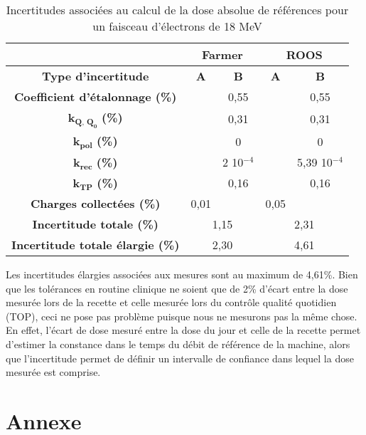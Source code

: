 \documentclass{article}
\begin{document}
\begin{table}[h]
  \centering
  \begin{tabular}{c|cc|cc|}
  \cline{2-5}
  \textbf{} & \multicolumn{2}{c|}{\textbf{Farmer}} & \multicolumn{2}{c|}{\textbf{ROOS}} \\ \hline
  \multicolumn{1}{|c|}{\textbf{Type d'incertitude}} & \textbf{A} & \textbf{B} & \textbf{A} & \textbf{B} \\ \hline
  \multicolumn{1}{|c|}{\textbf{Coefficient d'étalonnage (\%)}} &  & 0,55 &  & 0,55 \\
  \multicolumn{1}{|c|}{$\mathbf{k_{Q,\, Q_0}}$ \textbf{(\%)}} &  & 0,31 &  & 0,31 \\
  \multicolumn{1}{|c|}{$\mathbf{k_{pol}}$ \textbf{(\%)}} &  & 0 &  & 0 \\
  \multicolumn{1}{|c|}{$\mathbf{k_{rec}}$ \textbf{(\%)}} &  & 2 10$^{-4}$ &  & 5,39 10$^{-4}$ \\
  \multicolumn{1}{|c|}{$\mathbf{k_{TP}}$ \textbf{(\%)}} &  & 0,16 &  & 0,16 \\
  \multicolumn{1}{|c|}{\textbf{Charges collectées (\%)}} & 0,01 &  & 0,05 & \textbf{} \\ \hline
  \multicolumn{1}{|c|}{\textbf{Incertitude totale (\%)}} & \multicolumn{2}{c|}{1,15} & \multicolumn{2}{c|}{2,31} \\
  \multicolumn{1}{|c|}{\textbf{Incertitude totale élargie (\%)}} & \multicolumn{2}{c|}{2,30} & \multicolumn{2}{c|}{4,61} \\ \hline
  \end{tabular}
  \caption{Incertitudes associées au calcul de la dose absolue de références pour un faisceau d'électrons de 18 MeV} 
  \label{table_resultats_incertitudes}
\end{table}

Les incertitudes élargies associées aux mesures sont au maximum de 4,61\%. Bien que les tolérances en routine clinique ne soient que de 2\% d’écart entre la dose mesurée lors de la recette et celle mesurée lors du contrôle qualité quotidien (TOP), ceci ne pose pas problème puisque nous ne mesurons pas la même chose. En effet, l’écart de dose mesuré entre la dose du jour et celle de la recette permet d’estimer la constance dans le temps du débit de référence de la machine, alors que l’incertitude permet de définir un intervalle de confiance dans lequel la dose mesurée est comprise.

\newpage
\section*{Annexe}
\end{document}
